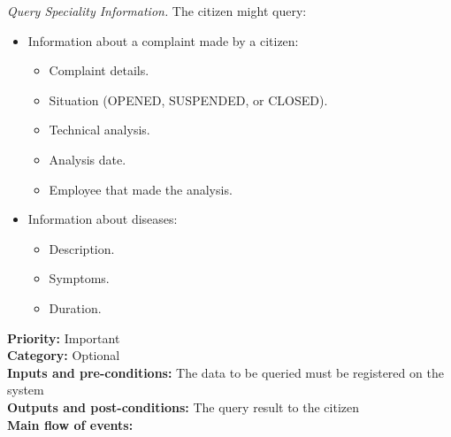 \documentclass[11pt,twoside]{article}
\begin{document}
\textit{Query Speciality Information.} The citizen might query:
\begin{itemize}
\item Information about a complaint made by a citizen:
\begin{itemize}
\item Complaint details.
\item Situation (OPENED, SUSPENDED, or CLOSED).
\item Technical analysis.
\item Analysis date.
\item Employee that made the analysis.
\end{itemize}
\item Information about diseases:
\begin{itemize}
\item Description.
\item Symptoms.
\item Duration.
\end{itemize}
\end{itemize}
\textbf{Priority:} Important \\ 
\textbf{Category:} Optional \\ 
\textbf{Inputs and pre-conditions:} The data to be queried must be registered on the system\\ 
\textbf{Outputs and post-conditions:}  The query result to the citizen\\  
\textbf{Main flow of events:}\\
\end{document}

